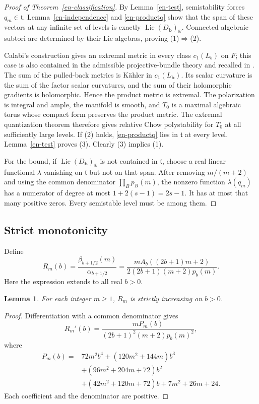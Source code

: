 \documentclass[12pt]{amsart}
\newtheorem{lem}[thm]{Lemma}
\theoremstyle{definition}
\theoremstyle{remark}
\numberwithin{equation}{section}
\DeclareMathOperator{\Lie}{Lie}
\newcommand{\R}{\mathbb{R}}
\begin{document}
\begin{proof}[Proof of Theorem~\ref{en-classification}]
By Lemma~\ref{en-test}, semistability forces $q_m\in\mathfrak t$. Lemma~\ref{en-independence} and \eqref{en-productq} show that the span of these vectors at any infinite set of levels is exactly $\Lie(D_{\boldsymbol b})_\R$. Connected algebraic subtori are determined by their Lie algebras, proving (1)$\Rightarrow$(2).

Calabi's construction gives an extremal metric in every class $c_1(L_b)$ on $F$; this case is also contained in the admissible projective-bundle theory \cite{en-Cal82,en-ACGTF} and recalled in \cite[\S5.1]{en-Jub26}. The sum of the pulled-back metrics is Kähler in $c_1(L_{\boldsymbol b})$. Its scalar curvature is the sum of the factor scalar curvatures, and the sum of their holomorphic gradients is holomorphic. Hence the product metric is extremal. The polarization is integral and ample, the manifold is smooth, and $T_0$ is a maximal algebraic torus whose compact form preserves the product metric. The extremal quantization theorem \cite{en-Mab16,en-Sey,en-ST} therefore gives relative Chow polystability for $T_0$ at all sufficiently large levels. If (2) holds, \eqref{en-productq} lies in $\mathfrak t$ at every level. Lemma~\ref{en-test} proves (3). Clearly (3) implies (1).

For the bound, if $\Lie(D_{\boldsymbol b})_\R$ is not contained in $\mathfrak t$, choose a real linear functional $\lambda$ vanishing on $\mathfrak t$ but not on that span. After removing $m/(m+2)$ and using the common denominator $\prod_Bp_B(m)$, the nonzero function $\lambda(q_m)$ has a numerator of degree at most $1+2(s-1)=2s-1$. It has at most that many positive zeros. Every semistable level must be among them.
\end{proof}

\subsection{Strict monotonicity}
Define
\begin{equation}\label{en-ratio}
 R_m(b)=\frac{\beta_{b+1/2}(m)}{\alpha_{b+1/2}}
 =\frac{mA_b((2b+1)m+2)}
 {2(2b+1)(m+2)p_b(m)}.
\end{equation}
Here the expression extends to all real $b>0$.

\begin{lem}\label{en-monotone}
For each integer $m\geq1$, $R_m$ is strictly increasing on $b>0$.
\end{lem}
\begin{proof}
Differentiation with a common denominator gives
\begin{equation}\label{en-derivative}
 R_m'(b)=
 \frac{mP_m(b)}{(2b+1)^2(m+2)p_b(m)^2},
\end{equation}
where
\begin{align*}
P_m(b)={}&72m^2b^4+(120m^2+144m)b^3\\
 &+(96m^2+204m+72)b^2\\
 &+(42m^2+120m+72)b+7m^2+26m+24.
\end{align*}
Each coefficient and the denominator are positive.
\end{proof}
\end{document}
